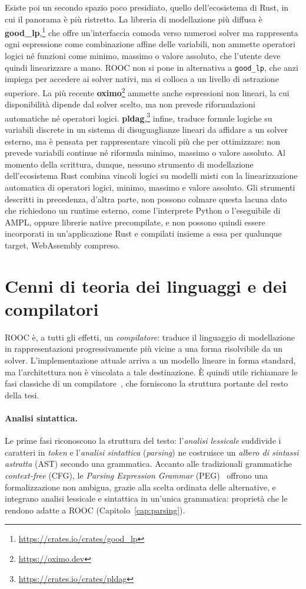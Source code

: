 Esiste poi un secondo spazio poco presidiato, quello dell'ecosistema di Rust, in
cui il panorama è più ristretto. La libreria di modellazione più diffusa è
\textbf{good\_lp},\footnote{\url{https://crates.io/crates/good_lp}} che offre
un'interfaccia comoda verso numerosi solver ma rappresenta ogni espressione come
combinazione affine delle variabili, non ammette operatori logici né funzioni
come minimo, massimo o valore assoluto, che l'utente deve quindi linearizzare a
mano. ROOC non si pone in alternativa a \texttt{good\_lp}, che anzi impiega per
accedere ai solver nativi, ma si colloca a un livello di astrazione superiore.
La più recente \textbf{oximo}\footnote{\url{https://oximo.dev}} ammette anche
espressioni non lineari, la cui disponibilità dipende dal solver scelto, ma non
prevede riformulazioni automatiche né operatori logici.
\textbf{pldag},\footnote{\url{https://crates.io/crates/pldag}}
infine, traduce formule logiche su variabili discrete in un sistema di
disuguaglianze lineari da affidare a un solver esterno, ma è pensata per
rappresentare vincoli più che per ottimizzare: non prevede variabili continue né
riformula minimo, massimo o valore assoluto. Al momento della scrittura, dunque,
nessuno strumento di modellazione dell'ecosistema Rust combina vincoli logici su
modelli misti con la linearizzazione automatica di operatori logici, minimo,
massimo e valore assoluto. Gli strumenti descritti in precedenza, d'altra parte,
non possono colmare questa lacuna dato che richiedono un runtime esterno, come
l'interprete Python o l'eseguibile di AMPL, oppure librerie native precompilate,
e non possono quindi essere incorporati in un'applicazione Rust e compilati
insieme a essa per qualunque target, WebAssembly compreso.

\section{Cenni di teoria dei linguaggi e dei compilatori}
\label{sec:teoria-compilatori}

ROOC è, a tutti gli effetti, un \emph{compilatore}: traduce il linguaggio di
modellazione in rappresentazioni progressivamente più vicine a una forma
risolvibile da un solver. L'implementazione attuale arriva a un modello lineare
in forma standard, ma l'architettura non è vincolata a tale destinazione. È
quindi utile richiamare le fasi classiche di un compilatore~\cite{aho2006}, che
forniscono la struttura portante del resto della tesi.

\paragraph{Analisi sintattica.}
Le prime fasi riconoscono la struttura del testo: l'\emph{analisi lessicale}
suddivide i caratteri in \emph{token} e l'\emph{analisi sintattica}
(\emph{parsing}) ne costruisce un \emph{albero di sintassi astratta} (AST)
secondo una grammatica. Accanto alle tradizionali grammatiche
\emph{context-free} (CFG), le \emph{Parsing Expression Grammar}
(PEG)~\cite{ford2004} offrono una formalizzazione non ambigua, grazie alla
scelta ordinata delle alternative, e integrano analisi lessicale e sintattica in
un'unica grammatica: proprietà che le rendono adatte a ROOC
(Capitolo~\ref{cap:parsing}).

